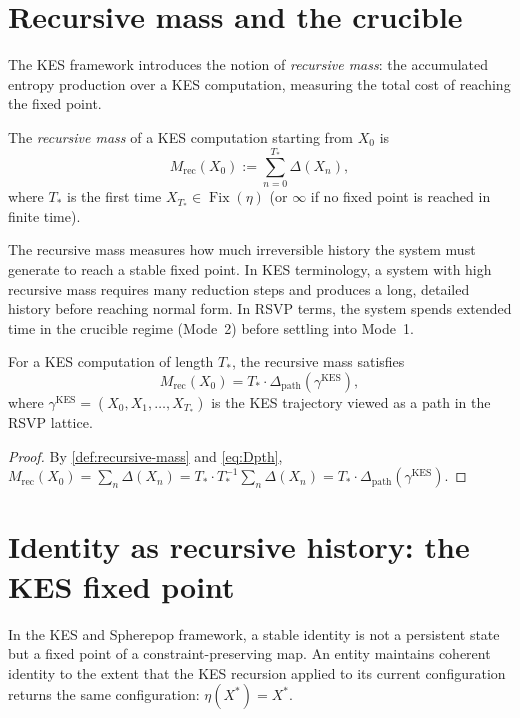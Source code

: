 \documentclass[12pt, oneside]{memoir}
\DeclareMathOperator{\Fix}{Fix}
\newcommand{\Dpth}{\Delta_{\mathrm{path}}}
\begin{document}
\section{Recursive mass and the crucible}

The KES framework introduces the notion of \emph{recursive mass}: the accumulated
entropy production over a KES computation, measuring the total cost of reaching the
fixed point.

\begin{definition}
\label{def:recursive-mass}
The \emph{recursive mass} of a KES computation starting from $X_0$ is
\[
  M_{\mathrm{rec}}(X_0) := \sum_{n=0}^{T_*} \Delta(X_n),
\]
where $T_*$ is the first time $X_{T_*} \in \Fix(\eta)$ (or $\infty$ if no fixed point
is reached in finite time).
\end{definition}

The recursive mass measures how much irreversible history the system must generate to
reach a stable fixed point.  In KES terminology, a system with high recursive mass
requires many reduction steps and produces a long, detailed history before reaching
normal form.  In RSVP terms, the system spends extended time in the crucible regime
(Mode~2) before settling into Mode~1.

\begin{proposition}
\label{prop:rec-mass}
For a KES computation of length $T_*$, the recursive mass satisfies
\[
  M_{\mathrm{rec}}(X_0) = T_* \cdot \Dpth(\gamma^{\mathrm{KES}}),
\]
where $\gamma^{\mathrm{KES}} = (X_0, X_1, \dots, X_{T_*})$ is the KES trajectory viewed
as a path in the RSVP lattice.
\end{proposition}

\begin{proof}
By \cref{def:recursive-mass} and \cref{eq:Dpth}, $M_{\mathrm{rec}}(X_0) = \sum_n
\Delta(X_n) = T_* \cdot T_*^{-1} \sum_n \Delta(X_n) = T_* \cdot \Dpth(\gamma^{\mathrm{KES}})$.
\end{proof}

\section{Identity as recursive history: the KES fixed point}

In the KES and Spherepop framework, a stable identity is not a persistent state but a
fixed point of a constraint-preserving map.  An entity maintains coherent identity to the
extent that the KES recursion applied to its current configuration returns the same
configuration: $\eta(X^*) = X^*$.
\end{document}
